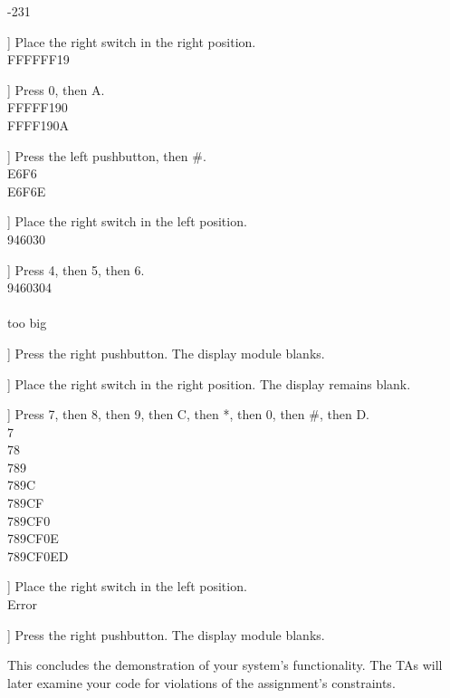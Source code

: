 \begin{description}
    {\dviiseg -\phantom{8888}231}
\item[[ ]] Place the right switch in the right position. \\
    {\dviiseg FFFFFF19}
\item[[ ]] Press 0, then A. \\
    {\dviiseg FFFFF190} \\
    {\dviiseg FFFF190A}
\item[[ ]] Press the left pushbutton, then \#. \\
    {\dviiseg \phantom{8888}E6F6} \\
    {\dviiseg \phantom{888}E6F6E}
\item[[ ]] Place the right switch in the left position. \\
    {\dviiseg \phantom{88}946030}
\item[[ ]] Press 4, then 5, then 6. \\
    {\dviiseg \phantom{8}9460304} \\
    {} \\
    {\dviiseg \phantom{8}too big}
\item[[ ]] Press the right pushbutton. The display module blanks.
\item[[ ]] Place the right switch in the right position. The display remains
    blank.
\item[[ ]] Press 7, then 8, then 9, then C, then *, then 0, then \#, then D. \\
    {\dviiseg \phantom{8888888}7} \\
    {\dviiseg \phantom{888888}78} \\
    {\dviiseg \phantom{88888}789} \\
    {\dviiseg \phantom{8888}789C} \\
    {\dviiseg \phantom{888}789CF} \\
    {\dviiseg \phantom{88}789CF0} \\
    {\dviiseg \phantom{8}789CF0E} \\
    {\dviiseg 789CF0ED}
\item[[ ]] Place the right switch in the left position. \\
    {\dviiseg \phantom{888}Error}
\item[[ ]] Press the right pushbutton. The display module blanks.
\end{description}

This concludes the demonstration of your system's functionality. The TAs will
later examine your code for violations of the assignment's constraints.

